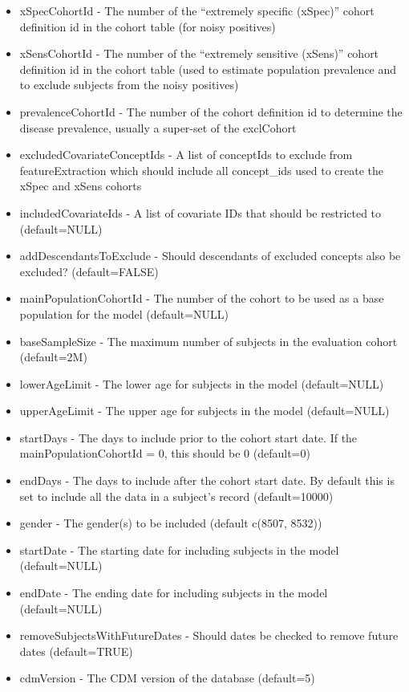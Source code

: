 \documentclass[
]{article}
\begin{document}
\begin{itemize}
\item
  xSpecCohortId - The number of the ``extremely specific (xSpec)''
  cohort definition id in the cohort table (for noisy positives)
\item
  xSensCohortId - The number of the ``extremely sensitive (xSens)''
  cohort definition id in the cohort table (used to estimate population
  prevalence and to exclude subjects from the noisy positives)
\item
  prevalenceCohortId - The number of the cohort definition id to
  determine the disease prevalence, usually a super-set of the
  exclCohort
\item
  excludedCovariateConceptIds - A list of conceptIds to exclude from
  featureExtraction which should include all concept\_ids used to create
  the xSpec and xSens cohorts
\item
  includedCovariateIds - A list of covariate IDs that should be
  restricted to (default=NULL)
\item
  addDescendantsToExclude - Should descendants of excluded concepts also
  be excluded? (default=FALSE)
\item
  mainPopulationCohortId - The number of the cohort to be used as a base
  population for the model (default=NULL)
\item
  baseSampleSize - The maximum number of subjects in the evaluation
  cohort (default=2M)
\item
  lowerAgeLimit - The lower age for subjects in the model (default=NULL)
\item
  upperAgeLimit - The upper age for subjects in the model (default=NULL)
\item
  startDays - The days to include prior to the cohort start date. If the
  mainPopulationCohortId = 0, this should be 0 (default=0)
\item
  endDays - The days to include after the cohort start date. By default
  this is set to include all the data in a subject's record
  (default=10000)
\item
  gender - The gender(s) to be included (default c(8507, 8532))
\item
  startDate - The starting date for including subjects in the model
  (default=NULL)
\item
  endDate - The ending date for including subjects in the model
  (default=NULL)
\item
  removeSubjectsWithFutureDates - Should dates be checked to remove
  future dates (default=TRUE)
\item
  cdmVersion - The CDM version of the database (default=5)

\end{itemize}
\end{document}
